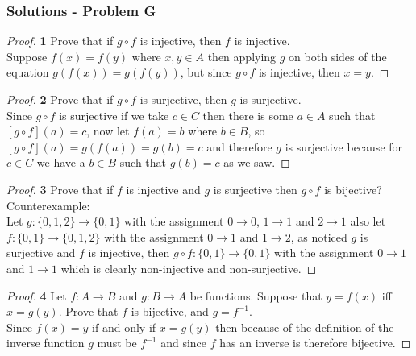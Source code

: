 \documentclass[11pt]{article}
\begin{document}
	\subsubsection*{Solutions - Problem G}
		\begin{proof}{\textbf{1}} Prove that if $g \circ f$ is injective, then $f$ is injective.\\
			Suppose $f(x)=f(y)$ where $x,y \in A$ then applying $g$ on both sides of the equation $g(f(x))=g(f(y))$, but since $g \circ f$ is injective, then $x=y$.
		\end{proof}
		\begin{proof}{\textbf{2}} Prove that if $g \circ f$ is surjective, then $g$ is surjective.\\
			Since $g \circ f$ is surjective if we take $c \in C$ then there is some $a \in A$ such that $[g \circ f](a)=c$, now let $f(a)=b$ where $b \in B$, so $[g \circ f](a)=g(f(a))=g(b)=c$ and therefore $g$ is surjective because for $c \in C$
 we have a $b \in B$ such that $g(b)=c$ as we saw.
 		\end{proof}
 		\begin{proof}{\textbf{3}} Prove that if $f$ is injective and $g$ is surjective then $g \circ f$ is bijective?\\
			Counterexample:\\
			Let $g:\{0,1,2\} \rightarrow \{0,1\}$ with the assignment $0 \rightarrow 0$, $1 \rightarrow 1$ and $2 \rightarrow 1$ also let $f:\{0,1\} \rightarrow \{0,1,2\}$ with the assignment $0 \rightarrow 1$ and $1 \rightarrow 2$, as noticed $g$ is surjective and $f$ is injective, then $g \circ f: \{0,1\} \rightarrow \{0,1\}$ with the assignment $0 \rightarrow 1$ and $1 \rightarrow 1$ which is clearly non-injective and non-surjective.
 		\end{proof}
  		\begin{proof}{\textbf{4}} Let $f: A \to B$ and $g:B \to A$ be functions. Suppose that $y=f(x)$ iff $x=g(y)$. Prove that $f$ is bijective, and $g=f^{-1}$.\\
  			Since $f(x)=y$ if and only if $x=g(y)$ then because of the definition of the inverse function $g$ must be $f^{-1}$ and since $f$ has an inverse is therefore bijective.
  		\end{proof}
\cleardoublepage
\end{document}
